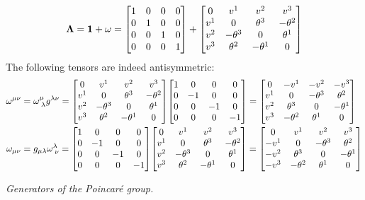 \documentclass{report}
\begin{document}
\begin{subquests}
	\begin{gather*}
		\vb \Lambda = \vb 1 + \mathbf{\omega} = \mqty[
			1 & 0 & 0 & 0 \\
			0 & 1 & 0 & 0 \\
			0 & 0 & 1 & 0 \\
			0 & 0 & 0 & 1
		] +	\mqty[
			0 & v^1 & v^2 & v^3 \\
			v^1 & 0 & \theta^3 & -\theta^2 \\
			v^2 & -\theta^3 & 0 & \theta^1 \\
			v^3 & \theta^2 & -\theta^1 & 0
		]
	\end{gather*}
	The following tensors are indeed antisymmetric:
	\begin{align*}
		\omega^{\mu\nu} & = \omega^{\mu}_{\;\lambda}g^{\lambda\nu} =
		\mqty[
			0 & v^1 & v^2 & v^3 \\
			v^1 & 0 & \theta^3 & -\theta^2 \\
			v^2 & -\theta^3 & 0 & \theta^1 \\
			v^3 & \theta^2 & -\theta^1 & 0
		]
		\mqty[
			1 & 0 & 0 & 0 \\
			0 & -1 & 0 & 0 \\
			0 & 0 & -1 & 0 \\
			0 & 0 & 0 & -1 
		] = \mqty[
			0 & -v^1 & -v^2 & -v^3 \\
			v^1 & 0 & -\theta^3 & \theta^2 \\
			v^2 & \theta^3 & 0 & -\theta^1 \\
			v^3 & -\theta^2 & \theta^1 & 0
		] \\
		\omega_{\mu\nu} & = g_{\mu\lambda}\omega^{\lambda}_{\;\nu} =
		\mqty[
			1 & 0 & 0 & 0 \\
			0 & -1 & 0 & 0 \\
			0 & 0 & -1 & 0 \\
			0 & 0 & 0 & -1 
		]\mqty[
			0 & v^1 & v^2 & v^3 \\
			v^1 & 0 & \theta^3 & -\theta^2 \\
			v^2 & -\theta^3 & 0 & \theta^1 \\
			v^3 & \theta^2 & -\theta^1 & 0
		] = \mqty[
			0 & v^1 & v^2 & v^3 \\
			-v^1 & 0 & -\theta^3 & \theta^2 \\
			-v^2 & \theta^3 & 0 & -\theta^1 \\
			-v^3 & -\theta^2 & \theta^1 & 0
		]
	\end{align*}

	\item \emph{Generators of the Poincar\'e group.}
\end{subquests}
\end{document}
